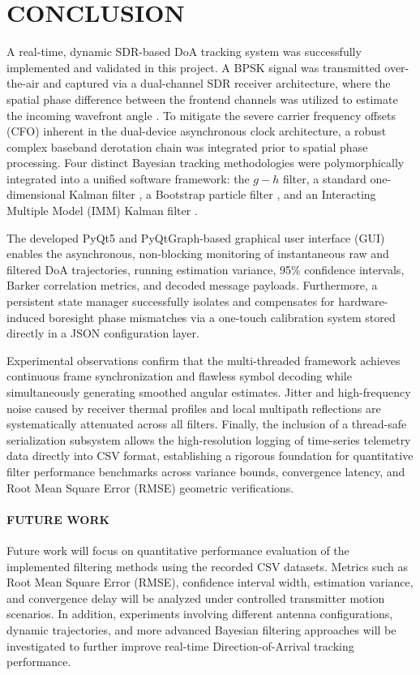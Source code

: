 \documentclass[conference]{IEEEtran}
\begin{document}
\section{CONCLUSION}
\label{sec:conclusion}

A real-time, dynamic SDR-based DoA tracking system was successfully implemented and validated in this project. A BPSK signal was transmitted over-the-air and captured via a dual-channel SDR receiver architecture, where the spatial phase difference between the frontend channels was utilized to estimate the incoming wavefront angle \cite{Zhou2024RealTime}. To mitigate the severe carrier frequency offsets (CFO) inherent in the dual-device asynchronous clock architecture, a robust complex baseband derotation chain was integrated prior to spatial phase processing. Four distinct Bayesian tracking methodologies were polymorphically integrated into a unified software framework: the $g-h$ filter, a standard one-dimensional Kalman filter \cite{Hou2023BayesianDoA}, a Bootstrap particle filter \cite{Zocca2022PFWeight}, and an Interacting Multiple Model (IMM) Kalman filter \cite{Lim2020IMMPF, Hou2023RobustVB-EKF}.

The developed PyQt5 and PyQtGraph-based graphical user interface (GUI) enables the asynchronous, non-blocking monitoring of instantaneous raw and filtered DoA trajectories, running estimation variance, 95\% confidence intervals, Barker correlation metrics, and decoded message payloads. Furthermore, a persistent state manager successfully isolates and compensates for hardware-induced boresight phase mismatches via a one-touch calibration system stored directly in a JSON configuration layer. 

Experimental observations confirm that the multi-threaded framework achieves continuous frame synchronization and flawless symbol decoding while simultaneously generating smoothed angular estimates. Jitter and high-frequency noise caused by receiver thermal profiles and local multipath reflections are systematically attenuated across all filters. Finally, the inclusion of a thread-safe serialization subsystem allows the high-resolution logging of time-series telemetry data directly into CSV format, establishing a rigorous foundation for quantitative filter performance benchmarks across variance bounds, convergence latency, and Root Mean Square Error (RMSE) geometric verifications.

\paragraph{FUTURE WORK}
Future work will focus on quantitative performance evaluation of the implemented filtering methods using the recorded CSV datasets. Metrics such as Root Mean Square Error (RMSE), confidence interval width, estimation variance, and convergence delay will be analyzed under controlled transmitter motion scenarios. In addition, experiments involving different antenna configurations, dynamic trajectories, and more advanced Bayesian filtering approaches will be investigated to further improve real-time Direction-of-Arrival tracking performance.
\end{document}
